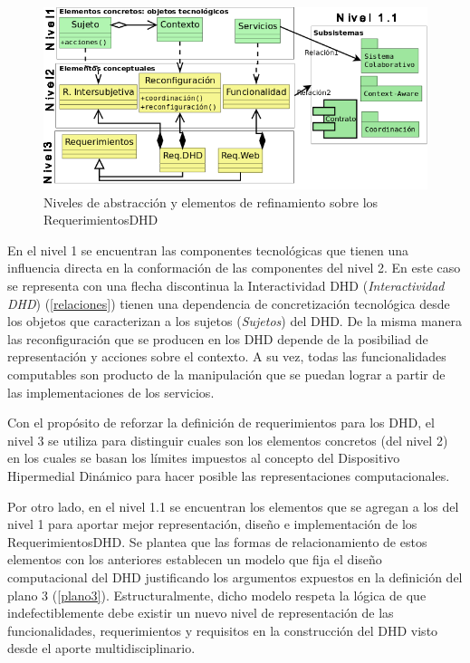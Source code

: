 \begin{descrition}
\begin{definition}
\begin{figure}
\begin{center}
 \includegraphics[width=5 in,totalheight=2.3 in] {DHD/RequerimientosDHD}
   \caption{Niveles de abstracción y elementos de refinamiento sobre
los RequerimientosDHD} \label{fig: RequerimientosDHD}
\end{center}
\end{figure}


En el nivel 1 se encuentran las componentes tecnológicas que tienen una
influencia directa en la conformación de las componentes del nivel 2. En este
caso se representa con una flecha discontinua la Interactividad DHD
(\textit{Interactividad DHD}) (\ref{relaciones}) tienen una  dependencia de
concretización tecnológica desde los objetos que caracterizan a los sujetos
(\textit{Sujetos}) del DHD. De la misma manera las reconfiguración
que se producen en los DHD depende de la posibiliad de representación y
acciones sobre el contexto. A su vez, todas las funcionalidades computables son
producto de la manipulación que se puedan lograr a partir de las
implementaciones de los servicios.  

Con el propósito de reforzar la definición de requerimientos para los DHD,
el nivel 3 se utiliza para distinguir cuales son los elementos concretos (del
nivel 2) en los cuales se basan los límites impuestos al concepto del Dispositivo Hipermedial
Dinámico para hacer posible las representaciones computacionales. 

Por otro lado, en el nivel 1.1 se encuentran los elementos que se agregan a los
del nivel 1 para aportar mejor representación, diseño e implementación de
los RequerimientosDHD. Se plantea que las formas de relacionamiento de estos elementos con los anteriores establecen un modelo que fija el diseño
computacional del DHD justificando los argumentos expuestos en la definición del plano 3
(\ref{plano3}). Estructuralmente, dicho modelo respeta la lógica de que
indefectiblemente debe existir un nuevo nivel de representación de las
funcionalidades, requerimientos y requisitos en la construcción del DHD visto desde el aporte multidisciplinario.


\end{definition}
\end{descrition}
